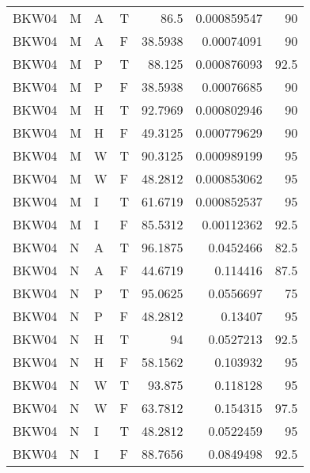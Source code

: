 \begin{tabular}{llllrrr}
    BKW04    & M     & A     & T          & 86.5       & 0.000859547 & 90       \\
    BKW04    & M     & A     & F          & 38.5938    & 0.00074091  & 90       \\
    BKW04    & M     & P     & T          & 88.125     & 0.000876093 & 92.5     \\
    BKW04    & M     & P     & F          & 38.5938    & 0.00076685  & 90       \\
    BKW04    & M     & H     & T          & 92.7969    & 0.000802946 & 90       \\
    BKW04    & M     & H     & F          & 49.3125    & 0.000779629 & 90       \\
    BKW04    & M     & W     & T          & 90.3125    & 0.000989199 & 95       \\
    BKW04    & M     & W     & F          & 48.2812    & 0.000853062 & 95       \\
    BKW04    & M     & I     & T          & 61.6719    & 0.000852537 & 95       \\
    BKW04    & M     & I     & F          & 85.5312    & 0.00112362  & 92.5     \\
    BKW04    & N     & A     & T          & 96.1875    & 0.0452466   & 82.5     \\
    BKW04    & N     & A     & F          & 44.6719    & 0.114416    & 87.5     \\
    BKW04    & N     & P     & T          & 95.0625    & 0.0556697   & 75       \\
    BKW04    & N     & P     & F          & 48.2812    & 0.13407     & 95       \\
    BKW04    & N     & H     & T          & 94         & 0.0527213   & 92.5     \\
    BKW04    & N     & H     & F          & 58.1562    & 0.103932    & 95       \\
    BKW04    & N     & W     & T          & 93.875     & 0.118128    & 95       \\
    BKW04    & N     & W     & F          & 63.7812    & 0.154315    & 97.5     \\
    BKW04    & N     & I     & T          & 48.2812    & 0.0522459   & 95       \\
    BKW04    & N     & I     & F          & 88.7656    & 0.0849498   & 92.5     \\
    \hline
\end{tabular}